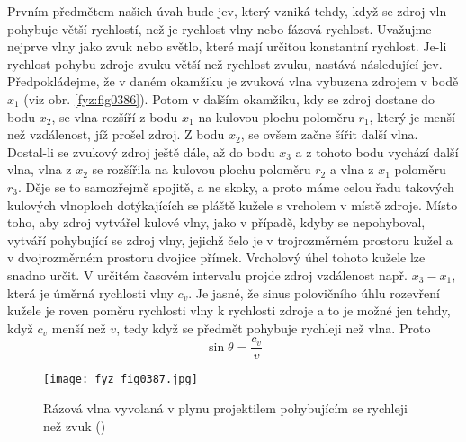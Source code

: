   Prvním předmětem našich úvah bude jev, který vzniká tehdy, když se zdroj vln pohybuje větší 
  rychlostí, než je rychlost vlny nebo fázová rychlost. Uvažujme nejprve vlny jako zvuk nebo 
  světlo, které mají určitou konstantní rychlost. Je-li rychlost pohybu zdroje zvuku větší než 
  rychlost zvuku, nastává následující jev. Předpokládejme, že v daném okamžiku je zvuková vlna 
  vybuzena zdrojem v bodě \(x_1\) (viz obr. \ref{fyz:fig0386}). Potom v dalším okamžiku, kdy se 
  zdroj dostane do bodu \(x_2\), se vlna rozšíří z bodu \(x_1\) na kulovou plochu poloměru \(r_1\), 
  který je menší než vzdálenost, jíž prošel zdroj. Z bodu \(x_2\), se ovšem začne šířit další vlna. 
  Dostal-li se zvukový zdroj ještě dále, až do bodu \(x_3\) a z tohoto bodu vychází další vlna, 
  vlna z \(x_2\) se rozšířila na kulovou plochu poloměru \(r_2\) a vlna z \(x_1\) poloměru \(r_3\). 
  Děje se to samozřejmě spojitě, a ne skoky, a proto máme celou řadu takových kulových vlnoploch 
  dotýkajících se pláště kužele s vrcholem v místě zdroje. Místo toho, aby zdroj vytvářel kulové 
  vlny, jako v případě, kdyby se nepohyboval, vytváří pohybující se zdroj vlny, jejichž čelo je v 
  trojrozměrném prostoru kužel a v dvojrozměrném prostoru dvojice přímek. Vrcholový úhel tohoto 
  kužele lze snadno určit. V určitém časovém intervalu projde zdroj vzdálenost např. \(x_3 - x_1\), 
  která je úměrná rychlosti vlny \(c_v\). Je jasné, že sinus polovičního úhlu rozevření kužele je 
  roven poměru rychlosti vlny k rychlosti zdroje a to je možné jen tehdy, když \(c_v\) menší než 
  \(v\), tedy když se předmět pohybuje rychleji než vlna. Proto
  \begin{equation}\label{fyz:eq527}
    \sin\theta = \dfrac{c_v}{v}
  \end{equation}
  
  \begin{figure}[ht!] %
    \centering
    \texttt{[image: fyz\_fig0387.jpg]}
    \caption{Rázová vlna vyvolaná v plynu projektilem pohybujícím se rychleji než zvuk
             (\cite[s.~687]{Feynman01})}
    \label{fyz:fig0387}
  \end{figure}
  

